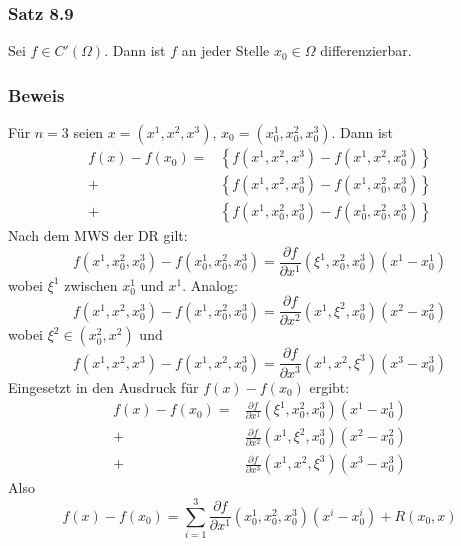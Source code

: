 \subsubsection*{Satz 8.9}
Sei $f\in C'\left(\Omega\right)$. Dann ist $f$ an jeder Stelle $x_0\in\Omega$ differenzierbar.

\subsubsection*{Beweis}
Für $n=3$ seien $x=\left( x^1,x^2,x^3\right)$, $x_0=\left( x_0^1,x_0^2,x_0^3\right)$. Dann ist
\begin{align*}
f\left( x \right) - f\left( {{x_0}} \right) = &\left\{ {f\left( {{x^1},{x^2},{x^3}} \right) - f\left( {{x^1},{x^2},x_0^3} \right)} \right\}\\
+ &\left\{ {f\left( {{x^1},{x^2},x_0^3} \right) - f\left( {{x^1},x_0^2,x_0^3} \right)} \right\}\\
+ &\left\{ {f\left( {{x^1},x_0^2,x_0^3} \right) - f\left( {x_0^1,x_0^2,x_0^3} \right)} \right\}
\end{align*}
Nach dem MWS der DR gilt: \[f\left( {{x^1},x_0^2,x_0^3} \right) - f\left( {x_0^1,x_0^2,x_0^3} \right) = \frac{{\partial f}}{{\partial {x^1}}}\left( {{\xi ^1},x_0^2,x_0^3} \right)\left( x^1-x_0^1\right)\]
wobei $\xi^1$ zwischen $x_0^1$ und $x^1$. Analog:
\[f\left( {{x^1},{x^2},x_0^3} \right) - f\left( {{x^1},x_0^2,x_0^3} \right) = \frac{{\partial f}}{{\partial {x^2}}}\left( {{x^1},{\xi ^2},x_0^3} \right)\left( {{x^2} - x_0^2} \right)\] wobei $\xi^2\in\left(x_0^2,x^2\right)$
und \[f\left( {{x^1},{x^2},{x^3}} \right) - f\left( {{x^1},{x^2},x_0^3} \right) = \frac{{\partial f}}{{\partial {x^3}}}\left( {{x^1},{x^2},{\xi ^3}} \right)\left( {{x^3} - x_0^3} \right)\]
Eingesetzt in den Ausdruck für $f(x)-f(x_0)$ ergibt:
\begin{align*}
f\left( x \right) - f\left( {{x_0}} \right) = &\frac{{\partial f}}{{\partial {x^1}}}\left( {{\xi ^1},x_0^2,x_0^3} \right)\left( {{x^1} - x_0^1} \right)\\
+ &\frac{{\partial f}}{{\partial {x^2}}}\left( {{x^1},{\xi ^2},x_0^3} \right)\left( {{x^2} - x_0^2} \right)\\ + &\frac{{\partial f}}{{\partial {x^3}}}\left( {{x^1},{x^2},{\xi ^3}} \right)\left( {{x^3} - x_0^3} \right)
\end{align*}
Also
\[f\left( x \right) - f\left( {{x_0}} \right) = \sum\limits_{i = 1}^3 {\frac{{\partial f}}{{\partial {x^1}}}\left( {x_0^1,x_0^2,x_0^3} \right)\left( {{x^i} - x_0^i} \right)}  + R\left( {{x_0},x} \right)\]
